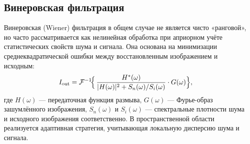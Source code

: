 \documentclass[a4paper,12pt]{article}
\begin{document}
\subsection{Винеровская фильтрация}
Винеровская (Wiener) фильтрация в общем случае не является чисто «ранговой», но часто рассматривается как нелинейная обработка при априорном учёте статистических свойств шума и сигнала. Она основана на минимизации среднеквадратической ошибки между восстановленным изображением и исходным:
\[
I_{\text{out}} = \mathcal{F}^{-1}\!\Bigl\{\, 
  \frac{H^*(\omega)}{\lvert H(\omega)\rvert^2 + S_n(\omega)/S_i(\omega)}
  \cdot G(\omega)
\Bigr\},
\]
где \(H(\omega)\) --- передаточная функция размыва, \(G(\omega)\) --- Фурье-образ зашумлённого изображения, \(S_n(\omega)\) и \(S_i(\omega)\) --- спектральные плотности шума и исходного изображения соответственно. В пространственной области реализуется адаптивная стратегия, учитывающая локальную дисперсию шума и сигнала. 
\end{document}
